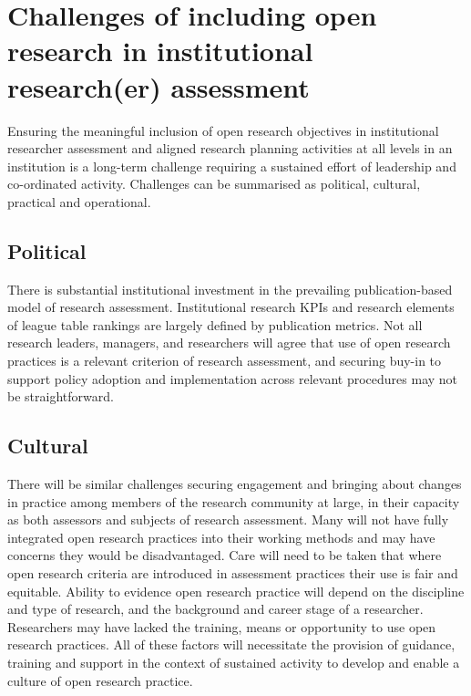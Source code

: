 \documentclass[
  letterpaper,
  DIV=11,
  numbers=noendperiod,
  oneside]{scrreprt}
\begin{document}



\section{Challenges of including open research in institutional
research(er)
assessment}\label{challenges-of-including-open-research-in-institutional-researcher-assessment}

Ensuring the meaningful inclusion of open research objectives in
institutional researcher assessment and aligned research planning
activities at all levels in an institution is a long-term challenge
requiring a sustained effort of leadership and co-ordinated activity.
Challenges can be summarised as political, cultural, practical and
operational.

\subsection{Political}\label{political}

There is substantial institutional investment in the prevailing
publication-based model of research assessment. Institutional research
KPIs and research elements of league table rankings are largely defined
by publication metrics. Not all research leaders, managers, and
researchers will agree that use of open research practices is a relevant
criterion of research assessment, and securing buy-in to support policy
adoption and implementation across relevant procedures may not be
straightforward.

\subsection{Cultural}\label{cultural}

There will be similar challenges securing engagement and bringing about
changes in practice among members of the research community at large, in
their capacity as both assessors and subjects of research assessment.
Many will not have fully integrated open research practices into their
working methods and may have concerns they would be disadvantaged. Care
will need to be taken that where open research criteria are introduced
in assessment practices their use is fair and equitable. Ability to
evidence open research practice will depend on the discipline and type
of research, and the background and career stage of a researcher.
Researchers may have lacked the training, means or opportunity to use
open research practices. All of these factors will necessitate the
provision of guidance, training and support in the context of sustained
activity to develop and enable a culture of open research practice.
\end{document}

